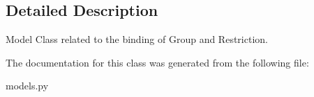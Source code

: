 \subsection{Detailed Description}
Model Class related to the binding of Group and Restriction. 

The documentation for this class was generated from the following file\+:\begin{DoxyCompactItemize}
\item 
models.\+py\end{DoxyCompactItemize}
